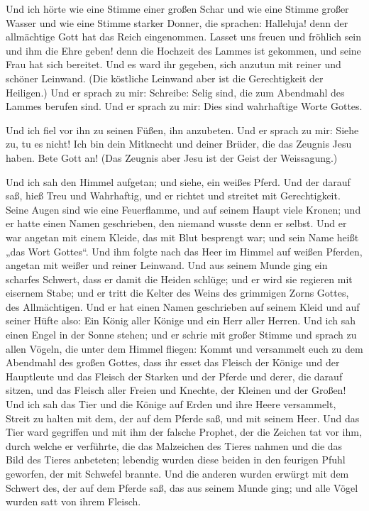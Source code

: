  Und ich hörte wie eine Stimme einer großen Schar und wie
eine Stimme großer Wasser und wie eine Stimme starker Donner, die
sprachen: Halleluja! denn der allmächtige Gott hat das Reich
eingenommen.  Lasset uns freuen und fröhlich sein und ihm
die Ehre geben! denn die Hochzeit des Lammes ist gekommen, und seine
Frau hat sich bereitet.  Und es ward ihr gegeben, sich
anzutun mit reiner und schöner Leinwand. (Die köstliche Leinwand aber
ist die Gerechtigkeit der Heiligen.)  Und er sprach zu
mir: Schreibe: Selig sind, die zum Abendmahl des Lammes berufen sind.
Und er sprach zu mir: Dies sind wahrhaftige Worte Gottes.

 Und ich fiel vor ihn zu seinen Füßen, ihn anzubeten. Und
er sprach zu mir: Siehe zu, tu es nicht! Ich bin dein Mitknecht und
deiner Brüder, die das Zeugnis Jesu haben. Bete Gott an! (Das Zeugnis
aber Jesu ist der Geist der Weissagung.)

 Und ich sah den Himmel aufgetan; und siehe, ein weißes
Pferd. Und der darauf saß, hieß Treu und Wahrhaftig, und er richtet und
streitet mit Gerechtigkeit.  Seine Augen sind wie eine
Feuerflamme, und auf seinem Haupt viele Kronen; und er hatte einen Namen
geschrieben, den niemand wusste denn er selbst.  Und er
war angetan mit einem Kleide, das mit Blut besprengt war; und sein Name
heißt „das Wort Gottes``.  Und ihm folgte nach das Heer
im Himmel auf weißen Pferden, angetan mit weißer und reiner Leinwand.
 Und aus seinem Munde ging ein scharfes Schwert, dass er
damit die Heiden schlüge; und er wird sie regieren mit eisernem Stabe;
und er tritt die Kelter des Weins des grimmigen Zorns Gottes, des
Allmächtigen.  Und er hat einen Namen geschrieben auf
seinem Kleid und auf seiner Hüfte also: Ein König aller Könige und ein
Herr aller Herren.  Und ich sah einen Engel in der Sonne
stehen; und er schrie mit großer Stimme und sprach zu allen Vögeln, die
unter dem Himmel fliegen: Kommt und versammelt euch zu dem Abendmahl des
großen Gottes,  dass ihr esset das Fleisch der Könige und
der Hauptleute und das Fleisch der Starken und der Pferde und derer, die
darauf sitzen, und das Fleisch aller Freien und Knechte, der Kleinen und
der Großen!  Und ich sah das Tier und die Könige auf
Erden und ihre Heere versammelt, Streit zu halten mit dem, der auf dem
Pferde saß, und mit seinem Heer.  Und das Tier ward
gegriffen und mit ihm der falsche Prophet, der die Zeichen tat vor ihm,
durch welche er verführte, die das Malzeichen des Tieres nahmen und die
das Bild des Tieres anbeteten; lebendig wurden diese beiden in den
feurigen Pfuhl geworfen, der mit Schwefel brannte.  Und
die anderen wurden erwürgt mit dem Schwert des, der auf dem Pferde saß,
das aus seinem Munde ging; und alle Vögel wurden satt von ihrem Fleisch.


